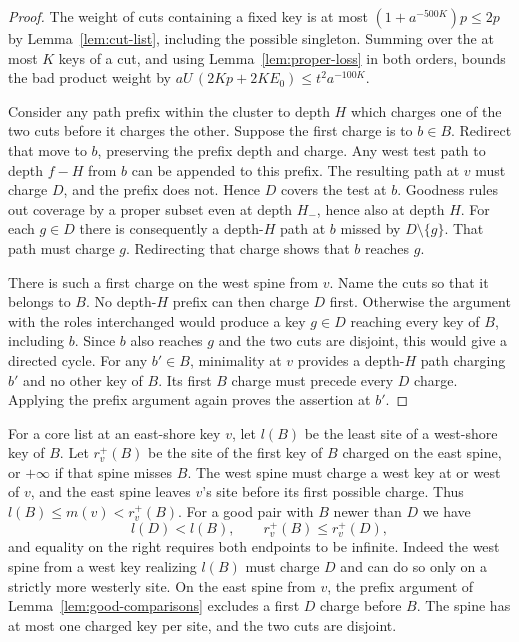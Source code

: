 \begin{proof}
The weight of cuts containing a fixed key is at most
$(1+a^{-500K})p\le2p$ by Lemma~\ref{lem:cut-list}, including the
possible singleton. Summing over the at most $K$ keys of a cut, and using
Lemma~\ref{lem:proper-loss} in both orders, bounds the bad product weight
by $aU\,(2Kp+2K E_0)\le t^2a^{-100K}$.

Consider any path prefix within the cluster to depth $H$ which charges
one of the two cuts before it charges the other. Suppose the first charge
is to $b\in B$. Redirect that move to $b$, preserving the prefix depth
and charge. Any west test path to depth $f-H$ from $b$ can be appended
to this prefix. The resulting path at $v$ must charge $D$, and the
prefix does not. Hence $D$ covers the test at $b$. Goodness rules out
coverage by a proper subset even at depth $H_-$, hence also at depth $H$.
For each $g\in D$ there is consequently a depth-$H$ path at $b$ missed
by $D\setminus\{g\}$. That path must charge $g$. Redirecting that charge shows
that $b$ reaches $g$.

There is such a first charge on the west spine from $v$. Name the cuts
so that it belongs to $B$. No depth-$H$ prefix can then charge $D$
first. Otherwise the argument with the roles interchanged would produce a
key \(g\in D\) reaching every key of \(B\), including \(b\). Since
\(b\) also reaches \(g\) and the two cuts are disjoint, this would
give a directed cycle. For any $b'\in B$, minimality at $v$
provides a depth-$H$ path charging $b'$ and no other key of $B$.
Its first $B$ charge must precede every $D$ charge. Applying the prefix
argument again proves the assertion at $b'$.
\end{proof}

For a core list at an east-shore key $v$, let $l(B)$ be the least site
of a west-shore key of $B$. Let $r_v^+(B)$ be the site of the first key
of $B$ charged on the east spine, or $+\infty$ if that spine misses $B$. The west spine must
charge a west key at or west of $v$, and the east spine leaves $v$'s
site before its first possible charge. Thus $l(B)\le m(v)<r_v^+(B)$.
For a good pair with $B$ newer than $D$ we have
\begin{equation}\label{eq:cut-endpoints}
 l(D)<l(B),\qquad r_v^+(B)\le r_v^+(D),
\end{equation}
and equality on the right requires both endpoints to be infinite.
Indeed the west spine from a west key realizing $l(B)$ must charge $D$
and can do so only on a strictly more westerly site. On the east spine
from $v$, the prefix argument of Lemma~\ref{lem:good-comparisons}
excludes a first $D$ charge before $B$. The spine has at most one charged
key per site, and the two cuts are disjoint.

